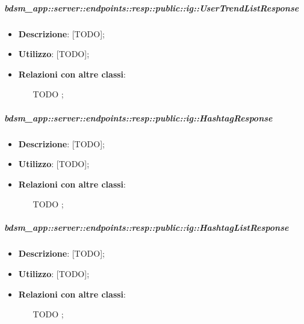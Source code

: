     \subparagraph{bdsm\_app::server::endpoints::resp::public::ig::UserTrendListResponse} %
    \label{subp:bdsm_app_server_endpoints_resp_public_ig_usertrendlistresponse}
    \begin{itemize}
      \item \textbf{Descrizione}: [TODO];
      \item \textbf{Utilizzo}: [TODO];
      \item \textbf{Relazioni con altre classi}:
        \begin{itemize}
          \item [TODO];
        \end{itemize}
      \end{itemize}
    
    \subparagraph{bdsm\_app::server::endpoints::resp::public::ig::HashtagResponse} %
    \label{subp:bdsm_app_server_endpoints_resp_public_ig_hashtagresponse}
    \begin{itemize}
      \item \textbf{Descrizione}: [TODO];
      \item \textbf{Utilizzo}: [TODO];
      \item \textbf{Relazioni con altre classi}:
        \begin{itemize}
          \item [TODO];
        \end{itemize}
      \end{itemize}
    
    \subparagraph{bdsm\_app::server::endpoints::resp::public::ig::HashtagListResponse} %
    \label{subp:bdsm_app_server_endpoints_resp_public_ig_hashtaglistresponse}
    \begin{itemize}
      \item \textbf{Descrizione}: [TODO];
      \item \textbf{Utilizzo}: [TODO];
      \item \textbf{Relazioni con altre classi}:
        \begin{itemize}
          \item [TODO];
        \end{itemize}
      \end{itemize}
    
